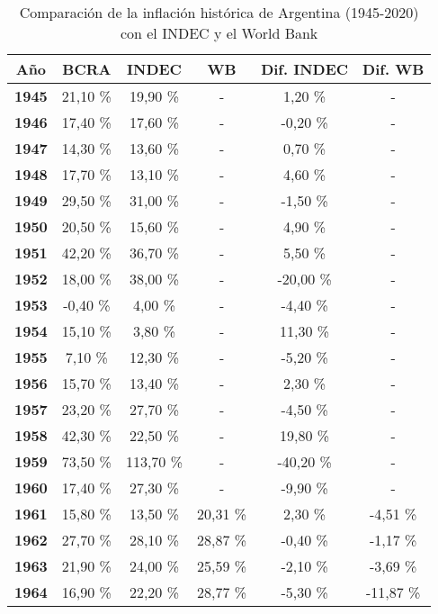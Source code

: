 \begin{center}
\begin{footnotesize}
\begin{longtable}{|c|c|c|c|c|c|}
\caption{Comparación de la inflación histórica de Argentina (1945-2020) con el INDEC y el World Bank}
\label{tab:inflacion-arg-extra}\\
\hline 
\textbf{Año} & \textbf{BCRA} & \textbf{INDEC} & \textbf{WB} & \textbf{Dif. INDEC} & \textbf{Dif. WB} \\ 
\hline 
\textbf{1945} & 21,10 \% & 19,90 \% & - & 1,20 \% & - \\ \hline
\textbf{1946} & 17,40 \% & 17,60 \% & - & -0,20 \% & - \\ \hline
\textbf{1947} & 14,30 \% & 13,60 \% & - & 0,70 \% & - \\ \hline
\textbf{1948} & 17,70 \% & 13,10 \% & - & 4,60 \% & - \\ \hline
\textbf{1949} & 29,50 \% & 31,00 \% & - & -1,50 \% & - \\ \hline
\textbf{1950} & 20,50 \% & 15,60 \% & - & 4,90 \% & - \\ \hline
\textbf{1951} & 42,20 \% & 36,70 \% & - & 5,50 \% & - \\ \hline
\textbf{1952} & 18,00 \% & 38,00 \% & - & -20,00 \% & - \\ \hline
\textbf{1953} & -0,40 \% & 4,00 \% & - & -4,40 \% & - \\ \hline
\textbf{1954} & 15,10 \% & 3,80 \% & - & 11,30 \% & - \\ \hline
\textbf{1955} & 7,10 \% & 12,30 \% & - & -5,20 \% & - \\ \hline
\textbf{1956} & 15,70 \% & 13,40 \% & - & 2,30 \% & - \\ \hline
\textbf{1957} & 23,20 \% & 27,70 \% & - & -4,50 \% & - \\ \hline
\textbf{1958} & 42,30 \% & 22,50 \% & - & 19,80 \% & - \\ \hline
\textbf{1959} & 73,50 \% & 113,70 \% & - & -40,20 \% & - \\ \hline
\textbf{1960} & 17,40 \% & 27,30 \% & - & -9,90 \% & - \\ \hline
\textbf{1961} & 15,80 \% & 13,50 \% & 20,31 \% & 2,30 \% & -4,51 \% \\ \hline
\textbf{1962} & 27,70 \% & 28,10 \% & 28,87 \% & -0,40 \% & -1,17 \% \\ \hline
\textbf{1963} & 21,90 \% & 24,00 \% & 25,59 \% & -2,10 \% & -3,69 \% \\ \hline
\textbf{1964} & 16,90 \% & 22,20 \% & 28,77 \% & -5,30 \% & -11,87 \% \\ \hline

\end{longtable}
\end{footnotesize}
\end{center}
